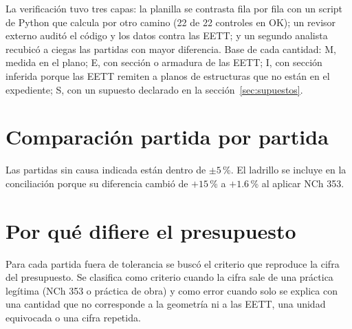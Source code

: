 \documentclass[letterpaper,10pt]{article}
\begin{document}
La verificación tuvo tres capas: la planilla se contrasta fila por fila con un script de Python que calcula por otro camino (22 de 22 controles en OK); un revisor externo auditó el código y los datos contra las EETT; y un segundo analista recubicó a ciegas las partidas con mayor diferencia. Base de cada cantidad: M, medida en el plano; E, con sección o armadura de las EETT; I, con sección inferida porque las EETT remiten a planos de estructuras que no están en el expediente; S, con un supuesto declarado en la sección~\ref{sec:supuestos}.

\section{Comparación partida por partida}
\begin{juntos}

Las partidas sin causa indicada están dentro de $\pm5$\,\%. El ladrillo se incluye en la conciliación porque su diferencia cambió de $+15$\,\% a $+1.6$\,\% al aplicar NCh 353.
\end{juntos}

\section{Por qué difiere el presupuesto}
\begin{juntos}
Para cada partida fuera de tolerancia se buscó el criterio que reproduce la cifra del presupuesto. Se clasifica como criterio cuando la cifra sale de una práctica legítima (NCh 353 o práctica de obra) y como error cuando solo se explica con una cantidad que no corresponde a la geometría ni a las EETT, una unidad equivocada o una cifra repetida.

\end{juntos}
\end{document}
